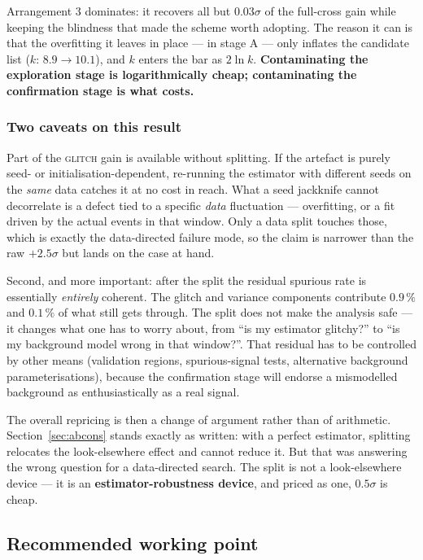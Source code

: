 Arrangement 3 dominates: it recovers all but $0.03\sigma$ of the full-cross gain while keeping the
blindness that made the scheme worth adopting. The reason it can is that the overfitting it leaves
in place --- in stage A --- only inflates the candidate list ($k$: $8.9 \to 10.1$), and $k$ enters
the bar as $2\ln k$. \textbf{Contaminating the exploration stage is logarithmically cheap;
contaminating the confirmation stage is what costs.}

\subsubsection*{Two caveats on this result}

Part of the \textsc{glitch} gain is available without splitting. If the artefact is purely
seed- or initialisation-dependent, re-running the estimator with different seeds on the
\emph{same} data catches it at no cost in reach. What a seed jackknife cannot decorrelate is a
defect tied to a specific \emph{data} fluctuation --- overfitting, or a fit driven by the actual
events in that window. Only a data split touches those, which is exactly the data-directed failure
mode, so the claim is narrower than the raw $+2.5\sigma$ but lands on the case at hand.

Second, and more important: after the split the residual spurious rate is essentially
\emph{entirely} coherent. The glitch and variance components contribute $0.9\,\%$ and $0.1\,\%$ of
what still gets through. The split does not make the analysis safe --- it changes what one has to
worry about, from ``is my estimator glitchy?'' to ``is my background model wrong in that window?''.
That residual has to be controlled by other means (validation regions, spurious-signal tests,
alternative background parameterisations), because the confirmation stage will endorse a
mismodelled background as enthusiastically as a real signal.

The overall repricing is then a change of argument rather than of arithmetic.
Section~\ref{sec:abcons} stands exactly as written: with a perfect estimator, splitting relocates
the look-elsewhere effect and cannot reduce it. But that was answering the wrong question for a
data-directed search. The split is not a look-elsewhere device --- it is an
\textbf{estimator-robustness device}, and priced as one, $0.5\sigma$ is cheap.

\subsection{Recommended working point}

